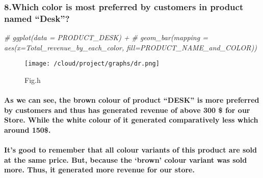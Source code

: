 \documentclass[
]{article}
\newenvironment{Shaded}{\begin{snugshade}}{\end{snugshade}}
\newcommand{\CommentTok}[1]{\textcolor[rgb]{0.56,0.35,0.01}{\textit{#1}}}
\begin{document}
\hypertarget{which-color-is-most-preferred-by-customers-in-product-named-desk-1}{%
\subsubsection{8.Which color is most preferred by customers in product
named
``Desk''?}\label{which-color-is-most-preferred-by-customers-in-product-named-desk-1}}

\begin{Shaded}
\begin{Highlighting}[]
\CommentTok{\# ggplot(data = PRODUCT\_DESK) +}
\CommentTok{\#   geom\_bar(mapping = aes(x=Total\_revenue\_by\_each\_color, fill=PRODUCT\_NAME\_and\_COLOR))}
\end{Highlighting}
\end{Shaded}

\begin{figure}
\centering
\texttt{[image: /cloud/project/graphs/dr.png]}
\caption{Fig.h}
\end{figure}

\hypertarget{as-we-can-see-the-brown-colour-of-product-desk-is-more-preferred-by-customers-and-thus-has-generated-revenue-of-above-300-for-our-store.-while-the-white-colour-of-it-generated-comparatively-less-which-around-150.}{%
\paragraph{As we can see, the brown colour of product ``DESK'' is more
preferred by customers and thus has generated revenue of above 300 \$
for our Store. While the white colour of it generated comparatively less
which around
150\$.}\label{as-we-can-see-the-brown-colour-of-product-desk-is-more-preferred-by-customers-and-thus-has-generated-revenue-of-above-300-for-our-store.-while-the-white-colour-of-it-generated-comparatively-less-which-around-150.}}

\hypertarget{its-good-to-remember-that-all-colour-variants-of-this-product-are-sold-at-the-same-price.-but-because-the-brown-colour-variant-was-sold-more.-thus-it-generated-more-revenue-for-our-store.}{%
\paragraph{It's good to remember that all colour variants of this
product are sold at the same price. But, because the `brown' colour
variant was sold more. Thus, it generated more revenue for our
store.}\label{its-good-to-remember-that-all-colour-variants-of-this-product-are-sold-at-the-same-price.-but-because-the-brown-colour-variant-was-sold-more.-thus-it-generated-more-revenue-for-our-store.}}
\end{document}
